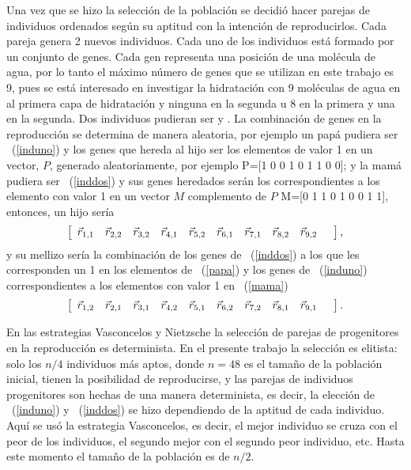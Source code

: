 Una vez que se hizo la selecci\'on de la poblaci\'on se decidi\'o 
hacer parejas de individuos ordenados seg\'un su aptitud con la 
intenci\'on de reproducirlos. Cada pareja genera 2 nuevos individuos.
Cada uno de los individuos est\'a formado por un conjunto de genes. 
Cada gen representa una posici\'on de una mol\'ecula de agua, por lo 
tanto el m\'aximo n\'umero de genes que se utilizan en este trabajo es
9, pues se est\'a interesado en investigar la hidrataci\'on con 9
mol\'eculas de agua en al primera capa de hidrataci\'on y ninguna en
la segunda u 8 en la primera y una en la segunda. Dos individuos 
pudieran ser 
\be\label{induno}
\ee
y
\be\label{inddos}
.
\ee
La combinaci\'on de genes en la reproducci\'on se determina de
manera aleatoria, por ejemplo un pap\'a pudiera ser ~(\ref{induno}) y
los genes que hereda al hijo ser los elementos de valor 1 en un 
vector, $P$, generado aleatoriamente, por ejemplo
\be\label{papa}
P=[1 0 0 1 0 1 1 0 0];
\ee
y la mam\'a pudiera ser ~(\ref{inddos}) y sus genes heredados ser\'an
los correspondientes a los elemento con valor 1 en un vector $M$ 
complemento de $P$
\be\label{mama}
M=[0 1 1 0 1 0 0 1 1],
\ee
entonces, un hijo ser\'ia
$$
\left[\ba{ccccccccccc}
\vec r_{1,1} &\vec r_{2,2} &\vec r_{3,2} &\vec r_{4,1} &\vec r_{5,2} 
&\vec r_{6,1} &\vec r_{7,1} &\vec r_{8,2} &\vec r_{9,2} &
\ea\right],
$$
y su mellizo ser\'ia la combinaci\'on de los genes de ~(\ref{inddos}) a
los que les corresponden un 1 en los elementos de ~(\ref{papa}) y los
genes de ~(\ref{induno}) correspondientes a los elementos con valor 1
en ~(\ref{mama})
$$
\left[\ba{ccccccccccc}
\vec r_{1,2} &\vec r_{2,1} &\vec r_{3,1} &\vec r_{4,2} &\vec r_{5,1} 
&\vec r_{6,2} &\vec r_{7,2} &\vec r_{8,1} &\vec r_{9,1} &
\ea\right].
$$

En las estrategias Vasconcelos y Nietzsche \citep{Kur199901} la 
selecci\'on de parejas de progenitores en la reproducci\'on es 
determinista. En el presente trabajo la selecci\'on es elitista: solo
los $n/4$ individuos m\'as aptos, donde $n=48$ es el tama\~no de la 
poblaci\'on inicial, tienen la posibilidad de reproducirse, y las 
parejas de individuos progenitores son hechas de una manera determinista, es 
decir, la elecci\'on de ~(\ref{induno}) y ~(\ref{inddos}) se hizo 
dependiendo de la aptitud de cada individuo. Aqu\'i se us\'o la 
estrategia Vasconcelos, es decir, el mejor individuo se cruza con el 
peor de los individuos, el segundo mejor con el segundo peor 
individuo, etc. Hasta este momento el tama\~no de la poblaci\'on es 
de $n/2$.

